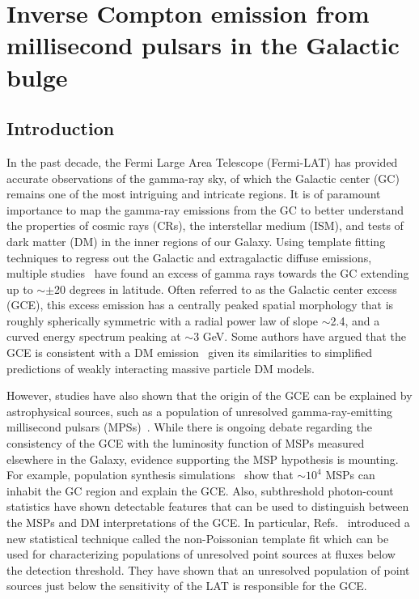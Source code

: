 \documentclass[doublespace,draft,nopageskip]{VTthesis} %
\begin{document}
\chapter{Inverse Compton emission from millisecond pulsars in the Galactic bulge} \label{ch:IC_MSPs}

\section{Introduction}
In the past decade, the Fermi Large Area Telescope (Fermi-LAT) has provided accurate observations of the gamma-ray sky, of which the Galactic center (GC) remains one of the most intriguing and intricate regions. It is of paramount importance to map the gamma-ray emissions from the GC to better understand the properties of cosmic rays (CRs), the interstellar medium (ISM), and tests of dark matter (DM) in the inner regions of our Galaxy. Using template fitting techniques to regress out the Galactic and extragalactic diffuse emissions, multiple studies~\cite{Goodenough:2009gk,Vitale:2009hr,Hooper:2010mq,Abazajian:2012pn,Gordon:2013vta, Macias:2013vya,Hooper:2013rwa,Abazajian:2014fta,Daylan:2014rsa,Calore:2014xka,Zhou:2014lva,TheFermi-LAT:2015kwa,TheFermi-LAT:2017vmf} have found an excess of gamma rays towards the GC extending up to $\sim\pm$20 degrees in latitude. Often referred to as the Galactic center excess (GCE), this excess emission has a centrally peaked spatial morphology that is roughly spherically symmetric with a radial power law of slope $\sim$2.4, and a curved energy spectrum peaking at $\sim$3 GeV. Some authors have argued that the GCE is consistent with a DM emission~\cite{Goodenough:2009gk,Abazajian:2012pn,Gordon:2013vta,Macias:2013vya,Calore:2014xka,Daylan:2014rsa} given its similarities to simplified predictions of weakly interacting massive particle DM models.

However, studies have also shown that the origin of the GCE can be explained by astrophysical sources, such as a population of unresolved gamma-ray-emitting millisecond pulsars (MPSs)~\cite{Abazajian:2010zy,Abazajian:2012pn,Gordon:2013vta,Macias:2013vya,Calore:2014xka,Daylan:2014rsa}. While there is ongoing debate regarding the consistency of the GCE with the luminosity function of MSPs measured elsewhere in the Galaxy\cite{Cholis:2014lta, Hooper:2015jlu, Ploeg:2017vai, Bartels:2018xom}, evidence supporting the MSP hypothesis is mounting. For example, population synthesis simulations~\cite{Gonthier:2018ymi} show that $\sim$$10^4$ MSPs can inhabit the GC region and explain the GCE. Also, subthreshold photon-count statistics have shown detectable features that can be used to distinguish between the MSPs and DM interpretations of the GCE. In particular, Refs.~\cite{Lee:2015fea,Mishra-Sharma:2016gis} introduced a new statistical technique called the non-Poissonian template fit which can be used for characterizing populations of unresolved point sources at fluxes below the detection threshold. They have shown that an unresolved population of point sources just below the sensitivity of the LAT is responsible for the GCE.
\end{document}
